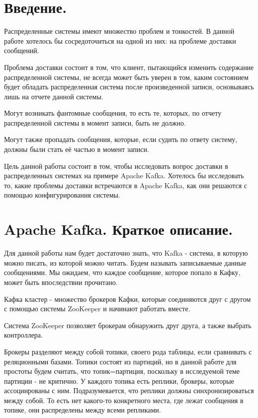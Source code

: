 \documentclass[11pt]{article}
\begin{document}
    \section{Введение.}

    Распределенные системы имеют множество проблем и тонкостей. В данной работе хотелось бы сосредоточиться на одной
    из них: на проблеме доставки сообщений.

    Проблема доставки состоит в том, что клиент, пытающийся изменить содержание распределенной системы, не всегда
    может быть уверен в том, каким состоянием будет обладать распределенная система после произведенной записи,
    основываясь лишь на отчете данной системы.

    Могут возникать фантомные сообщения, то есть те, которых, по отчету распределенной системы в момент записи, быть
    не должно.

    Могут также пропадать сообщения, которые, если судить по ответу систему, должны были стать её частью в момент
    записи.

    Цель данной работы состоит в том, чтобы исследовать вопрос доставки в распределенных системах на примере Apache
    Kafka. Хотелось бы исследовать то, какие проблемы доставки встречаются в Apache Kafka, как они решаются с помощью
    конфигурирования системы.

    \section{Apache Kafka. Краткое описание.}
    Для данной работы нам будет достаточно знать, что Kafka - система, в которую можно писать, из которой можно
    читать. Будем называть записываемые данные сообщениями. Мы ожидаем, что каждое сообщение, которое попало в Кафку,
    может быть впоследствии прочитано.

    Кафка кластер - множество брокеров Кафки, которые соединяются друг с другом с помощью системы ZooKeeper и
    начинают работать вместе.

    Система ZooKeeper позволяет брокерам обнаружить друг друга, а также выбрать контроллера.

    Брокеры разделяют между собой топики, своего рода таблицы, если сравнивать с реляционными базами. Топики состоят
    из партиций, но в данной работе для простоты будем считать, что топик=партиция, поскольку в исследуемой теме
    партиции - не критично. У каждого топика есть реплики, брокеры, которые ассоциированы с ним. Подразумевается, что
    реплики должны синхронизироваться между собой. То есть нет какого-то конкретного места, где лежат сообщения в
    топике, они распределены между всеми репликами.
\end{document}
